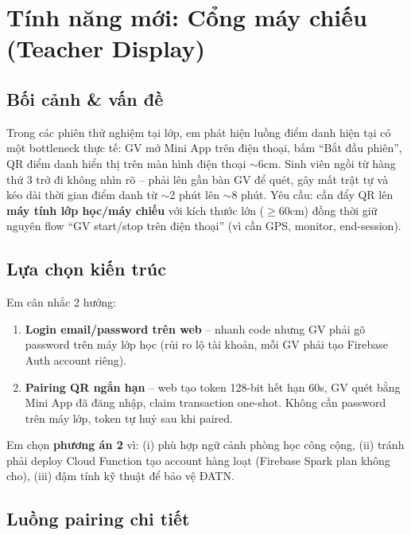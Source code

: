 \documentclass{article}
\begin{document}
\section{Tính năng mới: Cổng máy chiếu (Teacher Display)}

\subsection{Bối cảnh \& vấn đề}

Trong các phiên thử nghiệm tại lớp, em phát hiện luồng điểm danh hiện tại có một bottleneck thực tế: GV mở Mini App trên điện thoại, bấm ``Bắt đầu phiên'', QR điểm danh hiển thị trên màn hình điện thoại $\sim$6cm. Sinh viên ngồi từ hàng thứ 3 trở đi không nhìn rõ -- phải lên gần bàn GV để quét, gây mất trật tự và kéo dài thời gian điểm danh từ $\sim$2 phút lên $\sim$8 phút. Yêu cầu: cần đẩy QR lên \textbf{máy tính lớp học/máy chiếu} với kích thước lớn ($\geq 60$cm) đồng thời giữ nguyên flow ``GV start/stop trên điện thoại'' (vì cần GPS, monitor, end-session).

\subsection{Lựa chọn kiến trúc}

Em cân nhắc 2 hướng:

\begin{enumerate}[leftmargin=1.5em]
  \item \textbf{Login email/password trên web} -- nhanh code nhưng GV phải gõ password trên máy lớp học (rủi ro lộ tài khoản, mỗi GV phải tạo Firebase Auth account riêng).
  \item \textbf{Pairing QR ngắn hạn} -- web tạo token 128-bit hết hạn 60s, GV quét bằng Mini App đã đăng nhập, claim transaction one-shot. Không cần password trên máy lớp, token tự huỷ sau khi paired.
\end{enumerate}

Em chọn \textbf{phương án 2} vì: (i) phù hợp ngữ cảnh phòng học công cộng, (ii) tránh phải deploy Cloud Function tạo account hàng loạt (Firebase Spark plan không cho), (iii) đậm tính kỹ thuật để bảo vệ ĐATN.

\subsection{Luồng pairing chi tiết}
\end{document}
